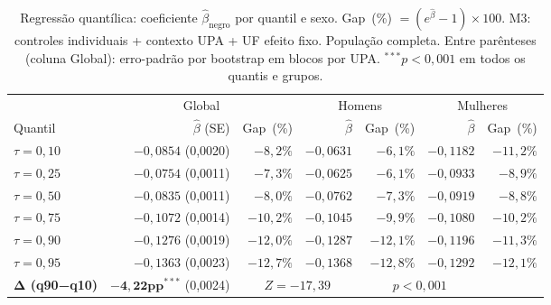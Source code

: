 \begin{table}[H]
\centering
\caption{Regressão quantílica: coeficiente $\hat{\beta}_{\text{negro}}$ por quantil e sexo.
         Gap~(\%) $= (e^{\hat{\beta}}-1)\times 100$.
         M3: controles individuais + contexto UPA + UF efeito fixo. População completa.
         Entre parênteses (coluna Global): erro-padrão por bootstrap em blocos por UPA.
         $^{***}p<0{,}001$ em todos os quantis e grupos.}
\label{tab:qr_melhorias}
\small
\begin{tabular}{lrrrrrr}
\toprule
& \multicolumn{2}{c}{Global} & \multicolumn{2}{c}{Homens} & \multicolumn{2}{c}{Mulheres} \\
\cmidrule(lr){2-3}\cmidrule(lr){4-5}\cmidrule(lr){6-7}
Quantil & $\hat{\beta}$ (SE) & Gap~(\%) & $\hat{\beta}$ & Gap~(\%) & $\hat{\beta}$ & Gap~(\%) \\
\midrule
$\tau=0{,}10$ & $-0{,}0854$ (0{,}0020) & $-8{,}2\%$ & $-0{,}0631$ & $-6{,}1\%$ & $-0{,}1182$ & $-11{,}2\%$ \\
$\tau=0{,}25$ & $-0{,}0754$ (0{,}0011) & $-7{,}3\%$ & $-0{,}0625$ & $-6{,}1\%$ & $-0{,}0933$ & $-8{,}9\%$ \\
$\tau=0{,}50$ & $-0{,}0835$ (0{,}0011) & $-8{,}0\%$ & $-0{,}0762$ & $-7{,}3\%$ & $-0{,}0919$ & $-8{,}8\%$ \\
$\tau=0{,}75$ & $-0{,}1072$ (0{,}0014) & $-10{,}2\%$ & $-0{,}1045$ & $-9{,}9\%$ & $-0{,}1080$ & $-10{,}2\%$ \\
$\tau=0{,}90$ & $-0{,}1276$ (0{,}0019) & $-12{,}0\%$ & $-0{,}1287$ & $-12{,}1\%$ & $-0{,}1196$ & $-11{,}3\%$ \\
$\tau=0{,}95$ & $-0{,}1363$ (0{,}0023) & $-12{,}7\%$ & $-0{,}1368$ & $-12{,}8\%$ & $-0{,}1292$ & $-12{,}1\%$ \\
\midrule
\textbf{Δ (q90−q10)} & $\mathbf{-4{,}22\text{pp}}^{***}$ (0{,}0024) & \multicolumn{2}{c}{$Z = -17{,}39$} & \multicolumn{2}{c}{$p < 0{,}001$} \\
\bottomrule
\end{tabular}
\end{table}
